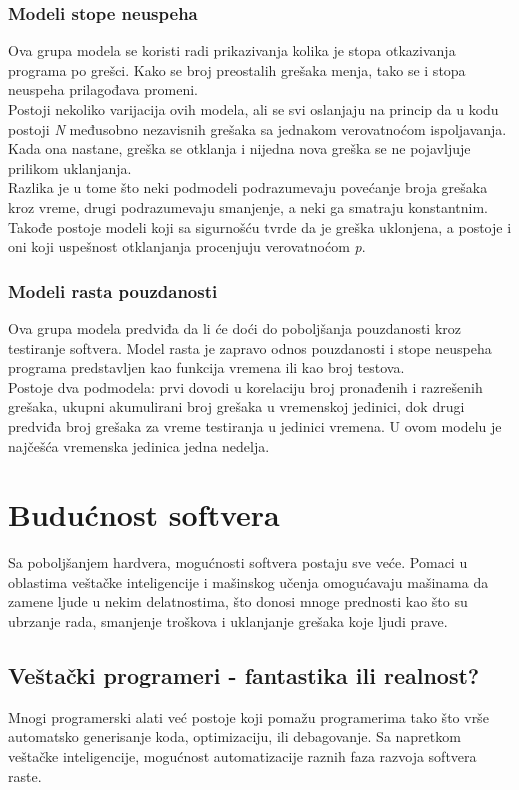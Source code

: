 \documentclass[a4paper]{article}
\begin{document}
\subsubsection{Modeli stope neuspeha}
\label{subsec:stopa_neuspeha}

Ova grupa modela se koristi radi prikazivanja kolika je stopa otkazivanja programa po grešci. Kako se broj preostalih grešaka menja, tako se i stopa neuspeha prilagođava promeni.\\
Postoji nekoliko varijacija ovih modela, ali se svi oslanjaju na princip da u kodu postoji \textit{N} međusobno nezavisnih grešaka sa jednakom verovatnoćom ispoljavanja. Kada ona nastane, greška se otklanja i nijedna nova greška se ne pojavljuje prilikom uklanjanja.\\
Razlika je u tome što neki podmodeli podrazumevaju povećanje broja grešaka kroz vreme, drugi podrazumevaju smanjenje, a neki ga smatraju konstantnim. Takođe postoje modeli koji sa sigurnošću tvrde da je greška uklonjena, a postoje i oni koji uspešnost otklanjanja procenjuju verovatnoćom \textit{p}.

\subsubsection{Modeli rasta pouzdanosti}
\label{subsec:rast_pouzdanosti}

Ova grupa modela predviđa da li će doći do poboljšanja pouzdanosti kroz testiranje softvera. Model rasta je zapravo odnos pouzdanosti i stope neuspeha programa predstavljen kao funkcija vremena ili kao broj testova.\\
Postoje dva podmodela: prvi dovodi u korelaciju broj pronađenih i razrešenih grešaka, ukupni akumulirani broj grešaka u vremenskoj jedinici, dok drugi predviđa broj grešaka za vreme testiranja u jedinici vremena. U ovom modelu je najčešća vremenska jedinica jedna nedelja.


\section{Budućnost softvera}
\label{buducnost}

Sa poboljšanjem hardvera, mogućnosti softvera postaju sve veće. Pomaci u oblastima veštačke inteligencije i mašinskog učenja omogućavaju mašinama da zamene ljude u nekim delatnostima, što donosi mnoge prednosti kao što su ubrzanje rada, smanjenje troškova i uklanjanje grešaka koje ljudi prave.

\subsection{Veštački programeri - fantastika ili realnost?}
Mnogi programerski alati već postoje koji pomažu programerima tako što vrše automatsko generisanje koda, optimizaciju, ili debagovanje. Sa napretkom veštačke inteligencije, mogućnost automatizacije raznih faza razvoja softvera raste. \\
\end{document}
